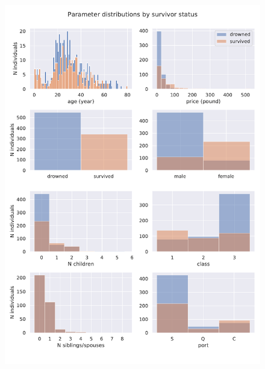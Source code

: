 \documentclass{book}
\begin{document}
\begin{figure}
    \centering
    \includegraphics[scale=0.75]{../figs/distributions2.pdf}
\end{figure}
\end{document}
